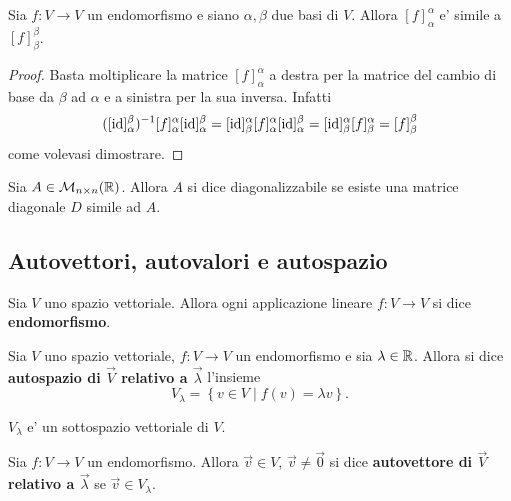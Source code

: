 \begin{proposition}
    Sia $f : V \to V$ un endomorfismo e siano $\alpha, \beta$ due basi di $V$. Allora $[f]_{\alpha}^{\alpha}$ e' simile a $[f]_{\beta}^{\beta}$.
\end{proposition}
\begin{proof}
    Basta moltiplicare la matrice $[f]_{\alpha}^{\alpha}$ a destra per la matrice del cambio di base da $\beta$ ad $\alpha$ e a sinistra per la sua inversa. Infatti \[
        ([\operatorname{id}]^{\beta}_{\alpha})^{-1}[f]_{\alpha}^{\alpha}[\operatorname{id}]^{\beta}_{\alpha} = [\operatorname{id}]^{\alpha}_{\beta}[f]_{\alpha}^{\alpha}[\operatorname{id}]^{\beta}_{\alpha} = [\operatorname{id}]^{\alpha}_{\beta}[f]_{\beta}^{\alpha} = [f]_{\beta}^{\beta}
    \] come volevasi dimostrare.
\end{proof}

\begin{definition}
    Sia $A \in \mathcal{M}_{n \times n}(\mathbb{R})$. Allora $A$ si dice diagonalizzabile se esiste una matrice diagonale $D$ simile ad $A$.
\end{definition}

\subsection{Autovettori, autovalori e autospazio}

\begin{definition}
    Sia $V$ uno spazio vettoriale. Allora ogni applicazione lineare $f : V \to V$ si dice \textbf{endomorfismo}.
\end{definition}

\begin{definition}
    Sia $V$ uno spazio vettoriale, $f : V \to V$ un endomorfismo e sia $\lambda \in \mathbb{R}$. Allora si dice \textbf{autospazio di $\vec{V}$ relativo a $\vec{\lambda}$} l'insieme \begin{equation}
        V_{\lambda} = \left\{ v \in V \mid f(v) = \lambda v \right\}.
    \end{equation}
\end{definition}

\begin{proposition}
    $V_{\lambda}$ e' un sottospazio vettoriale di $V$.
\end{proposition}

\begin{definition}
    Sia $f : V \to V$ un endomorfismo. Allora $\vec{v} \in V$, $\vec{v} \neq \vec{0}$ si dice \textbf{autovettore di $\vec{V}$ relativo a $\vec{\lambda}$} se $\vec{v} \in V_{\lambda}$.
\end{definition}


